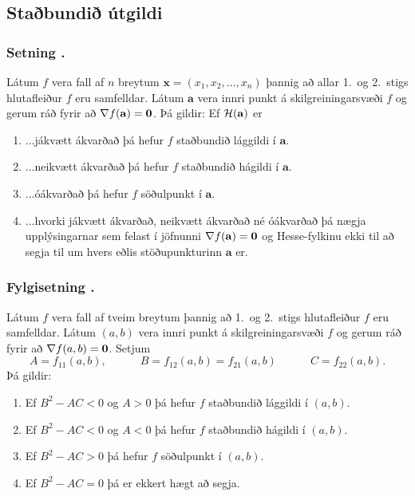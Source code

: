 

\subsection{Staðbundið útgildi} 

\subsubsection{Setning \kaflanr.}
 Látum $f$ vera fall af $n$ breytum $\mathbf{x} = (x_1,x_2,\ldots,x_n)$ þannig að allar
1.~og 2.~stigs hlutafleiður $f$ eru samfelldar.  Látum $\mathbf{a}$ vera
innri punkt á skilgreiningarsvæði $f$ og gerum ráð fyrir að $\nabla
f(\mathbf{a})=\mbox{${\bf 0}$}$.  Þá gildir: Ef ${\cal H}(\mathbf{a})$ er 
\begin {enumerate}
 \item  ...jákvætt ákvarðað þá hefur $f$ staðbundið
     lággildi í $\mathbf{a}$.
\item ...neikvætt ákvarðað þá hefur $f$ staðbundið
     hágildi í $\mathbf{a}$.
\item    ...óákvarðað þá hefur $f$ söðulpunkt í
      $\mathbf{a}$.  
\item ...hvorki jákvætt ákvarðað, neikvætt ákvarðað
      né óákvarðað þá nægja upplýsingarnar sem felast í jöfnunni
      $\nabla f(\mathbf{a})=\mbox{${\bf 0}$}$ og Hesse-fylkinu ekki til að segja til um
      hvers eðlis stöðupunkturinn $\mathbf{a}$ er.
\end {enumerate}






\subsubsection{Fylgisetning \kaflanr.}
Látum $f$ vera fall af tveim breytum þannig að
1.~og 2.~stigs hlutafleiður $f$ eru samfelldar.  Látum $(a,b)$ vera
innri punkt á skilgreiningarsvæði $f$ og gerum ráð fyrir að $\nabla
f(a,b)=\mbox{${\bf 0}$}$.  Setjum 
$$A=f_{11}(a,b),\qquad\quad B=f_{12}(a,b)=f_{21}(a,b)\qquad\quad
C=f_{22}(a,b).$$ 
Þá gildir:
\begin {enumerate}
 \item  Ef $B^2-AC<0$ og $A>0$  þá hefur $f$
     staðbundið lággildi í $(a,b)$.
 \item  Ef $B^2-AC<0$ og $A<0$ 
 þá hefur $f$ staðbundið
hágildi í $(a,b)$.
 \item   Ef $B^2-AC>0$ 
þá hefur $f$ söðulpunkt í
      $(a,b)$.  
 \item  Ef $B^2-AC=0$ þá er ekkert hægt að segja.  
\end {enumerate}



